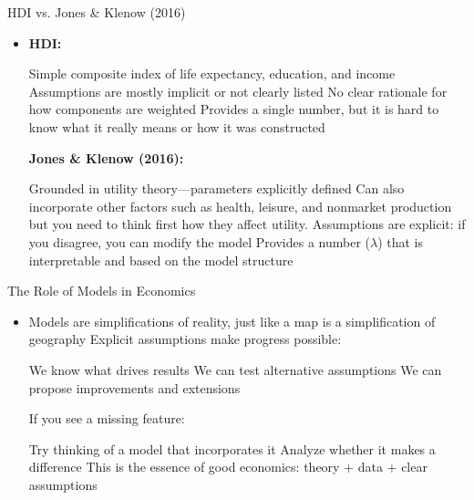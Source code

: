 \documentclass[10pt,aspectratio=169]{beamer}
\begin{document}
\begin{frame}{HDI vs. Jones \& Klenow (2016)}

\begin{itemize}
  \item \textbf{HDI:} 
  \begin{itemize}
    \itemvso Simple composite index of life expectancy, education, and income
    \itemvso Assumptions are mostly implicit or not clearly listed
    \itemvso No clear rationale for how components are weighted
    \itemvso Provides a single number, but it is hard to know what it really means or how it was constructed
  \end{itemize}

  \itemvso \textbf{Jones \& Klenow (2016):}
  \begin{itemize}
    \itemvso Grounded in utility theory—parameters explicitly defined
    \itemvso Can also incorporate other factors such as health, leisure, and nonmarket production but you need to think first how they affect utility.
    \itemvso Assumptions are explicit: if you disagree, you can modify the model
    \itemvso Provides a number (\(\lambda\)) that is interpretable and based on the model structure
  \end{itemize}
\end{itemize}

\end{frame}


\begin{frame}{The Role of Models in Economics}

\begin{itemize}
  \item Models are simplifications of reality, just like a map is a simplification of geography
  \itemvso Explicit assumptions make progress possible:
  \begin{itemize}
    \itemvso We know what drives results
    \itemvso We can test alternative assumptions
    \itemvso We can propose improvements and extensions
  \end{itemize}
  
  \itemvso If you see a missing feature:
  \begin{itemize}
    \itemvso Try thinking of a model that incorporates it
    \itemvso Analyze whether it makes a difference
    \itemvso This is the essence of good economics: theory + data + clear assumptions
  \end{itemize}
  
\end{itemize}

\end{frame}
\end{document}
